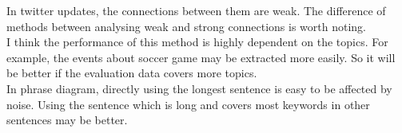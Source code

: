 \documentclass[a4paper]{article}
\begin{document}
In twitter updates, the connections between them are weak. The difference of methods between analysing weak and strong connections is worth noting.\\ 

I think the performance of this method is highly dependent on the topics. For example, the events about soccer game may be extracted more easily. So it will be better if the evaluation data covers more topics.\\

In phrase diagram, directly using the longest sentence is easy to be affected by noise. Using the sentence which is long and covers most keywords in other sentences may be better.


\end{document}
